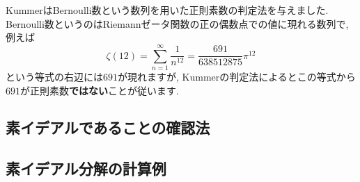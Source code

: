 \documentclass[11pt,b5paper,oneside,titlepage,lualatex]{ltjsreport}
\begin{document}
KummerはBernoulli数という数列を用いた正則素数の判定法を与えました. 
Bernoulli数というのはRiemannゼータ関数の正の偶数点での値に現れる数列で, 例えば
\[
\zeta(12) = \sum_{n=1}^{\infty} \frac{1}{n^{12}} = \frac{691}{638512875} \pi^{12}
\]
という等式の右辺には$ 691 $が現れますが, Kummerの判定法によるとこの等式から$ 691 $が正則素数\textbf{ではない}ことが従います. 




\section{素イデアルであることの確認法} \label{sec:素イデアルであることの確認法}






\section{素イデアル分解の計算例} \label{sec:素イデアル分解の計算例}







\clearpage






\chapter{} \label{chap:}






\section{} \label{sec:}

\end{document}
